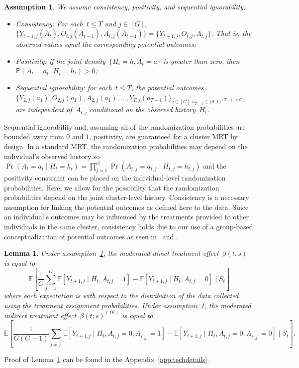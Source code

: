 \documentclass[12pt]{article}
\def\given{\, | \,}
\newtheorem{lemma}[thm]{Lemma}
\newtheorem{assumption}[thm]{Assumption}
\begin{document}
\begin{assumption} \normalfont
  \label{consistency}
  We assume consistency, positivity, and sequential ignorability:
  \begin{itemize}
  \item Consistency: For each~$t \leq T$ and $j \in [G]$,
    $\{Y_{t+1,j} (\bar{A}_{t} ), O_{t,j} (\bar A_{t-1}), A_{t,j} (\bar{A}_{t-1} )\}  = \{Y_{t+1, j}, O_{t,j}, A_{t,j}\}$.
    That is, the observed values equal the corresponding potential outcomes;
  \item Positivity: if the joint density~$\{ H_t = h, A_t = a\}$ is greater
    than zero, then~$\mathbb{P} (A_t = a_t \given H_t = h_t ) > 0$;
  \item Sequential ignorability: for each~$t \leq T$, the
    potential outcomes,\\ $\{Y_{2,j} ( a_{1}), O_{2,j}(a_{1}),A_{2,j}( a_{1}), \ldots,
    Y_{T,j} (\bar a_{T-1}) \}_{j \in [G], \bar a_{T-1}\in \{0,1\}^{(T-1)\times G}}$, are independent of~$A_{t,j}$ conditional on the observed history~$H_t$.
  \end{itemize}
\end{assumption}

Sequential ignorability and, assuming all of the randomization probabilities are bounded away from $0$ and $1$, positivity, are guaranteed for a cluster MRT by design. In a standard MRT, the randomization probabilities may depend on the individual's observed history so $\Pr(A_t = a_t \mid H_t = h_t) = \prod_{j=1}^G \Pr(A_{t,j} = a_{t,j} \mid H_{t,j} = h_{t,j})$ and the positivity constraint can be placed on the individual-level randomization probabilities.  Here, we allow for the possibility that the randomization probabilities depend on the joint cluster-level history. Consistency is a necessary assumption for linking the potential outcomes as defined here to the data. Since an individual's outcomes may be influenced by the treatments provided to other individuals in the same cluster, consistency holds due to our use of a group-based conceptualization of potential outcomes as seen in~\cite{Hong2006} and \cite{Vanderweele2013}.

\begin{lemma}
  \label{lemma:cond_effect}
  Under assumption~\ref{consistency}, the moderated direct treatment effect~$\beta(t;s)$ is equal to
  $$
  \mathbb{E} \left[ \frac{1}{G} \sum_{j=1}^G \mathbb{E} \left[ Y_{t+1,j} \mid H_{t}, A_{t,j} = 1 \right] - \mathbb{E} \left[ Y_{t+1,j} \mid H_{t}, A_{t,j} = 0 \right] \mid S_t \right]
  $$
  where each expectation is with respect to the distribution of the
  data collected using the treatment assignment probabilities. Under assumption~\ref{consistency}, the moderated indirect treatment effect~$\beta(t;s)^{(IE)}$ is equal to
  $$
  \mathbb{E} \left[ \frac{1}{G (G-1)} \sum_{j \neq j^\prime} \mathbb{E} \left[ Y_{t+1,j} \mid H_{t}, A_{t,j} = 0, A_{t,j^\prime} = 1 \right] - \mathbb{E} \left[ Y_{t+1,j} \mid H_{t}, A_{t,j} = 0, A_{t,j^\prime} = 0 \right] \mid S_t \right].
  $$
\end{lemma}
\noindent Proof of Lemma~\ref{lemma:cond_effect} can be found in the Appendix~\ref{app:techdetails}.
\end{document}
